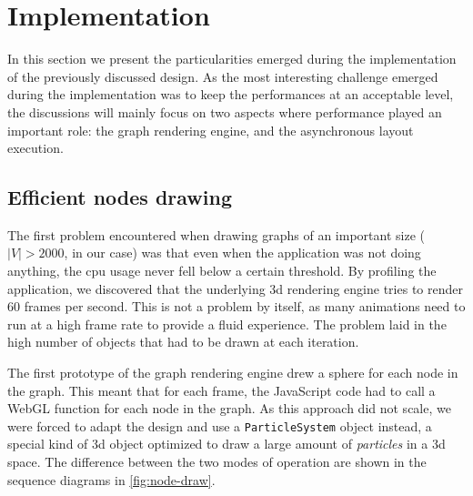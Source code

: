 \section{Implementation}
\label{sec:visu/implementation}

In this section we present the particularities emerged during the implementation of the previously discussed design. As the most interesting challenge emerged during the implementation was to keep the performances at an acceptable level, the discussions will mainly focus on two aspects where performance played an important role: the graph rendering engine, and the asynchronous layout execution.

\subsection{Efficient nodes drawing}

The first problem encountered when drawing graphs of an important size ($|V| > 2000$, in our case) was that even when the application was not doing anything, the \gls{cpu} usage never fell below a certain threshold. By profiling the application, we discovered that the underlying \gls{3d} rendering engine tries to render 60 frames per second. This is not a problem by itself, as many animations need to run at a high frame rate to provide a fluid experience. The problem laid in the high number of objects that had to be drawn at each iteration.

The first prototype of the graph rendering engine drew a sphere for each node in the graph. This meant that for each frame, the JavaScript code had to call a WebGL function for each node in the graph. As this approach did not scale, we were forced to adapt the design and use a \texttt{ParticleSystem} object instead, a special kind of \gls{3d} object optimized to draw a large amount of \emph{particles} in a \gls{3d} space. The difference between the two modes of operation are shown in the sequence diagrams in \vref{fig:node-draw}.

